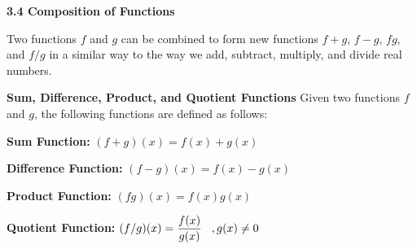 \documentclass[12pt]{book}
\newcommand{\D}{\displaystyle}
\begin{document}
\begin{comment}
Name: \underline{\hspace{100mm}}
\vspace{20mm}
  \centerline{\Large \textbf{Chapter 2: Equations and Inequalities} } 

{\large
\begin{center}
\begin{varwidth}{\textwidth}
\begin{enumerate}[2.1]
    \item The Regular Coordinate System and Graphs
    \item Linear Equations in One Variable
    \item Models and  Applications (Skipping)
    \item Complex Numbers
    \item Quadratic Equations
    \item Other Types of Equations
    \item Linear Inequalities and Absolute Value Inequalities
\end{enumerate}
\end{varwidth}
\end{center}

}
\newpage  
\end{comment}

\textbf{{\Large 3.4 Composition of Functions}}
\vspace{3mm}

Two functions $f$ and $g$ can be combined to form new functions $f+g$, $f-g$, $fg$, and $f/g$ in a similar way to the way we add, subtract, multiply, and divide real numbers.

\vspace{5mm}



\begin{boxR}
    \textbf{Sum, Difference, Product, and Quotient Functions}
    \vspace{1mm}
    \hline
    \vspace{2mm}
Given two functions $f$ and $g$, the following functions are defined as follows: 

\vspace{2mm}
\textbf{Sum Function:} $\D (f+g)(x)=f(x) + g(x)$
    \vspace{3mm}
    
\textbf{Difference Function:} $\D (f-g)(x)=f(x) - g(x)$
    \vspace{3mm}
    
\textbf{Product Function:}  $\D (fg)(x) = f(x)g(x)$
    \vspace{3mm}
    
    \textbf{Quotient Function:}
 $\D (f/g)(x) = \frac{f(x)}{g(x)} \hspace{3mm}, g(x)\neq 0$   


\end{boxR}
\end{document}
